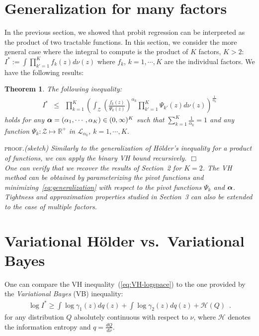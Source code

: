 \documentclass{article} %
\newcommand{\Holder}{H\"older\xspace}
\renewcommand{\t}{\mathbf{t}}
\newcommand{\Zspace}{\mathcal{Z}}
\newcommand{\I}{I}
\newcommand{\basem}{\nu}
\def\z{z}
\renewcommand{\Re}{\mathbb{R}}
\newenvironment{proof}{\textsc{proof.}\it}{\hfill{$\Box$}}
\newtheorem{theorem}{Theorem}
\begin{document}
\section{Generalization for many factors}
\label{many-factor}
In the previous section, we showed that probit regression can be interpreted as the product of two tractable functions. In this 
section, we consider the more general case where the integral to compute is the product of $K$ factors, $K>2$:
$\I^*:=\int \prod_{k'=1}^K f_k(\z) d\basem(\z)$ where $f_k$, $k=1,\cdots, K$ are the individual factors.
We have the following results:
\begin{theorem}
The following inequality:
\begin{eqnarray}
\label{eq:generalization}
I^*
&\le& 
\prod_{k=1}^K \left(
	\int_{\Zspace} {\left(\frac{f_k(\z)}{\Psi_k(\z)}\right)}^{\alpha_k} 
	\prod_{k'=1}^K \Psi_{k'}(\z) d\basem(\z)
	\right)^{\frac{1}{\alpha_k}}
\label{eq:Holder2}
\end{eqnarray}
holds for any ${\bm{\alpha}}=(\alpha_1,\cdots,\alpha_K)\in(0,\infty)^K$ such that $\sum_{k=1}^K \frac{1}{\alpha_k}=1$
and any function $\Psi_k:\Zspace\mapsto\Re^+$ in $\mathcal{L}_{\alpha_k}$, $k=1,\cdots, K$.
\end{theorem}
\begin{proof}(sketch)
Similarly to the generalization of \Holder's inequality for a product of functions, we can apply the binary VH bound recursively.
\end{proof}\\
One can verify that we recover the results of Section~2 for $K=2$. 
The VH method can be obtained by parameterizing the pivot functions and minimizing~\eqref{eq:generalization}  with respect
to the pivot functions $\Psi_k$ and ${\bm{\alpha}}$.
Tightness and approximation properties studied in Section~3
can also be extended to the case of multiple factors.

\section{Variational \Holder vs.~Variational Bayes}
One can compare the VH inequality~(\ref{eq:VH-logspace}) to the one provided by the \emph{Variational Bayes} 
(VB) inequality:
\begin{align}
\log\I^*
\ge 
\int \log\gamma_1(\z) dq(\z) + 
\int \log\gamma_2(\z) dq(\z) +
\mathcal{H}(Q)
\enspace.
\label{eq:VB-logspace}
\end{align}
for any distribution $Q$ absolutely continuous with respect to $\nu$, where $\mathcal{H}$ denotes the information entropy and $q=\frac{dQ}{d\nu}$. 
\end{document}
